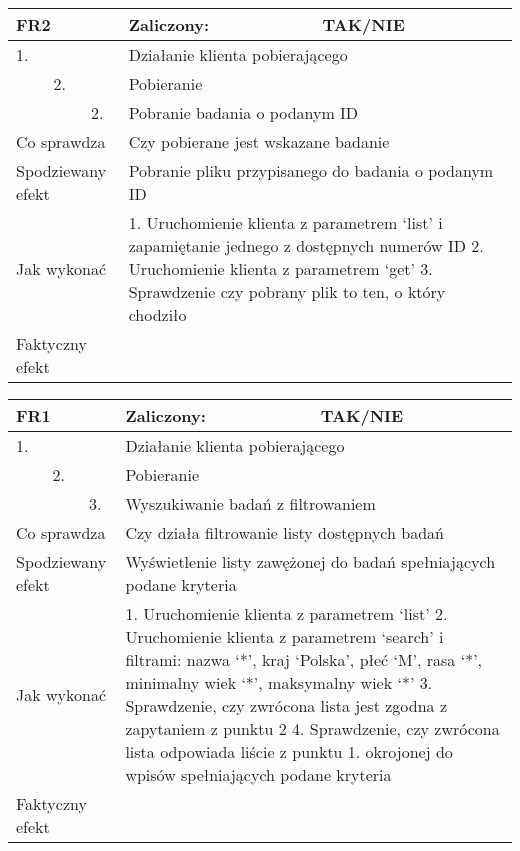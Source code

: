 \begin{tabular}{|p{20pt}|p{20pt}|p{20pt}|p{250pt}|p{60pt}|}
	\hline
	\multicolumn{3}{|p{70pt}|}{FR2} & Zaliczony: & TAK/NIE \\ \hline
	1. & & & \multicolumn{2}{|p{310pt}|}{Działanie klienta pobierającego } \\ \hline
	& 2. & & \multicolumn{2}{|p{310pt}|}{Pobieranie } \\ \hline
	& & 2. & \multicolumn{2}{|p{310pt}|}{Pobranie badania o podanym ID } \\ \hline
	\multicolumn{3}{|p{70pt}|}{Co sprawdza} & \multicolumn{2}{|p{310pt}|}{Czy pobierane jest wskazane badanie} \\ \hline
	\multicolumn{3}{|p{70pt}|}{Spodziewany efekt} & \multicolumn{2}{|p{310pt}|}{Pobranie pliku przypisanego do badania o podanym ID} \\ \hline
	\multicolumn{3}{|p{70pt}|}{Jak wykonać} & \multicolumn{2}{|p{310pt}|}{1. Uruchomienie klienta z parametrem ‘list’ i zapamiętanie jednego z dostępnych numerów ID
2. Uruchomienie klienta z parametrem ‘get’
3. Sprawdzenie czy pobrany plik to ten, o który chodziło} \\ \hline
	\multicolumn{3}{|p{70pt}|}{Faktyczny efekt} & \multicolumn{2}{|p{310pt}|}{} \\ \hline
\end{tabular}

\begin{tabular}{|p{20pt}|p{20pt}|p{20pt}|p{250pt}|p{60pt}|}
	\hline
	\multicolumn{3}{|p{70pt}|}{FR1} & Zaliczony: & TAK/NIE \\ \hline
	1. & & & \multicolumn{2}{|p{310pt}|}{Działanie klienta pobierającego } \\ \hline
	& 2. & & \multicolumn{2}{|p{310pt}|}{Pobieranie } \\ \hline
	& & 3. & \multicolumn{2}{|p{310pt}|}{Wyszukiwanie badań z filtrowaniem } \\ \hline
	\multicolumn{3}{|p{70pt}|}{Co sprawdza} & \multicolumn{2}{|p{310pt}|}{Czy działa filtrowanie listy dostępnych badań} \\ \hline
	\multicolumn{3}{|p{70pt}|}{Spodziewany efekt} & \multicolumn{2}{|p{310pt}|}{Wyświetlenie listy zawężonej do badań spełniających podane kryteria} \\ \hline
	\multicolumn{3}{|p{70pt}|}{Jak wykonać} & \multicolumn{2}{|p{310pt}|}{1. Uruchomienie klienta z parametrem ‘list’
2. Uruchomienie klienta z parametrem ‘search’ i filtrami: nazwa ‘*’, kraj ‘Polska’, płeć ‘M’, rasa ‘*’, minimalny wiek ‘*’, maksymalny wiek ‘*’
3. Sprawdzenie, czy zwrócona lista jest zgodna z zapytaniem z punktu 2
4. Sprawdzenie, czy zwrócona lista odpowiada liście z punktu 1. okrojonej do wpisów spełniających podane kryteria} \\ \hline
	\multicolumn{3}{|p{70pt}|}{Faktyczny efekt} & \multicolumn{2}{|p{310pt}|}{} \\ \hline
\end{tabular}

